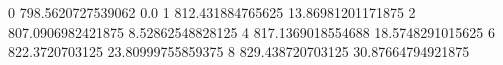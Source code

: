 0 798.5620727539062 0.0
1 812.431884765625 13.86981201171875
2 807.0906982421875 8.52862548828125
4 817.1369018554688 18.5748291015625
6 822.3720703125 23.80999755859375
8 829.438720703125 30.87664794921875

